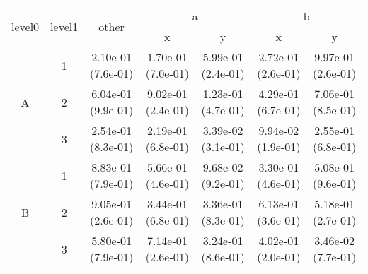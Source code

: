 \begin{tabular}{ccccccc}
\toprule
\multirow{2}{*}{level0} & \multirow{2}{*}{level1}& \multirow{2}{*}{other}&\multicolumn{2}{c}{a}&\multicolumn{2}{c}{b}\tabularnewline
\cmidrule(lr){4-5}
\cmidrule(lr){6-7}
&&&x&y&x&y\tabularnewline
\midrule
\multirow{3}{*}{A}&1& 2.10e-01 (7.6e-01)& 1.70e-01 (7.0e-01)& 5.99e-01 (2.4e-01)& 2.72e-01 (2.6e-01)& 9.97e-01 (2.6e-01)\tabularnewline
&2& 6.04e-01 (9.9e-01)& 9.02e-01 (2.4e-01)& 1.23e-01 (4.7e-01)& 4.29e-01 (6.7e-01)& 7.06e-01 (8.5e-01)\tabularnewline
&3& 2.54e-01 (8.3e-01)& 2.19e-01 (6.8e-01)& 3.39e-02 (3.1e-01)& 9.94e-02 (1.9e-01)& 2.55e-01 (6.8e-01)\tabularnewline
\midrule
\multirow{3}{*}{B}&1& 8.83e-01 (7.9e-01)& 5.66e-01 (4.6e-01)& 9.68e-02 (9.2e-01)& 3.30e-01 (4.6e-01)& 5.08e-01 (9.6e-01)\tabularnewline
&2& 9.05e-01 (2.6e-01)& 3.44e-01 (6.8e-01)& 3.36e-01 (8.3e-01)& 6.13e-01 (3.6e-01)& 5.18e-01 (2.7e-01)\tabularnewline
&3& 5.80e-01 (7.9e-01)& 7.14e-01 (2.6e-01)& 3.24e-01 (8.6e-01)& 4.02e-01 (2.0e-01)& 3.46e-02 (7.7e-01)\tabularnewline
\bottomrule
\end{tabular}
